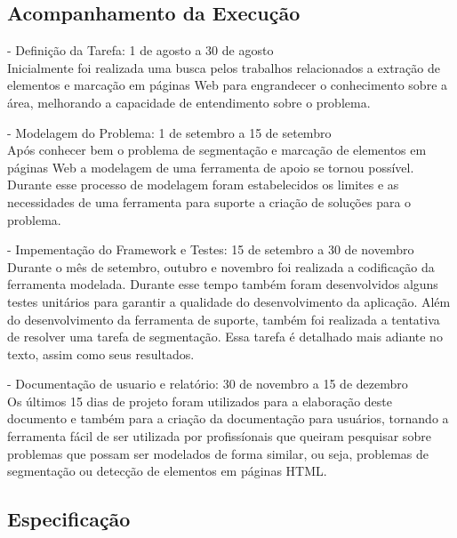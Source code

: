 \documentclass{acm_proc_article-sp}
\numberwithin{equation}{section}
\begin{document}
\subsection{Acompanhamento da Execução}

	- Definição da Tarefa: 1 de agosto a 30 de agosto \\
  Inicialmente foi realizada uma busca pelos trabalhos relacionados a
  extração de elementos e marcação em páginas Web para engrandecer o
  conhecimento sobre a área, melhorando a capacidade de entendimento
  sobre o problema.

	- Modelagem do Problema: 1 de setembro a 15 de setembro \\ 
  Após conhecer bem o problema de segmentação e marcação de elementos em
  páginas Web a modelagem de uma ferramenta de apoio se tornou possível.
  Durante esse processo de modelagem foram estabelecidos os limites e as
  necessidades de uma ferramenta para suporte a criação de soluções para
  o problema.

	- Impementação do Framework e Testes: 15 de setembro a 30 de novembro \\
  Durante o mês de setembro, outubro e novembro foi realizada a
  codificação da ferramenta modelada. Durante esse tempo também foram
  desenvolvidos alguns testes unitários para garantir a qualidade do
  desenvolvimento da aplicação. Além do desenvolvimento da ferramenta de
  suporte, também foi realizada a tentativa de resolver uma tarefa de
  segmentação. Essa tarefa é detalhado mais adiante no texto, assim como
  seus resultados.

	- Documentação de usuario e relatório: 30 de novembro a 15 de dezembro \\
  Os últimos 15 dias de projeto foram utilizados para a elaboração deste
  documento e também para a criação da documentação para usuários,
  tornando a ferramenta fácil de ser utilizada por profissíonais que
  queiram pesquisar sobre problemas que possam ser modelados de forma
  similar, ou seja, problemas de segmentação ou detecção de elementos em
  páginas HTML.



\subsection{Especificação}
\end{document}
